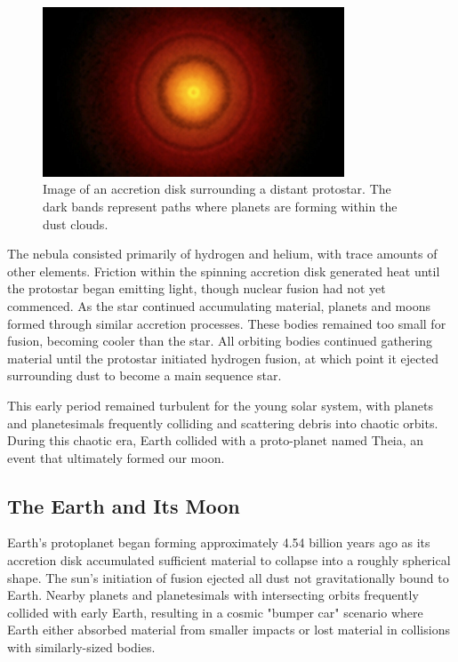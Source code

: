 \documentclass[12pt,oneside,a4paper,english]{article}
\begin{document}
\begin{figure}[H]
    \centering
    \includegraphics[width=0.8\textwidth]{SolarSys1.jpg}
    \caption{Image of an accretion disk surrounding a distant protostar. The dark bands represent paths where planets are forming within the dust clouds.\cite{solarsysImg}}
    \label{fig:solardisk}
\end{figure}

The nebula consisted primarily of hydrogen and helium, with trace amounts of other elements. Friction within the spinning accretion disk generated heat until the protostar began emitting light, though nuclear fusion had not yet commenced. As the star continued accumulating material, planets and moons formed through similar accretion processes. These bodies remained too small for fusion, becoming cooler than the star. All orbiting bodies continued gathering material until the protostar initiated hydrogen fusion, at which point it ejected surrounding dust to become a main sequence star.

This early period remained turbulent for the young solar system, with planets and planetesimals frequently colliding and scattering debris into chaotic orbits. During this chaotic era, Earth collided with a proto-planet named Theia\cite{moonformation}, an event that ultimately formed our moon.

\subsection{The Earth and Its Moon}
Earth's protoplanet began forming approximately 4.54 billion years ago as its accretion disk accumulated sufficient material to collapse into a roughly spherical shape. The sun's initiation of fusion ejected all dust not gravitationally bound to Earth. Nearby planets and planetesimals with intersecting orbits frequently collided with early Earth, resulting in a cosmic "bumper car" scenario where Earth either absorbed material from smaller impacts or lost material in collisions with similarly-sized bodies.
\end{document}
